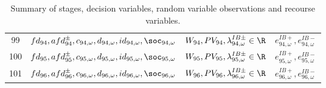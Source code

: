 \begin{table}[H]
\begin{tabular}{c c c c}
	99& $fd_{94}, afd^{\pm}_{94}, c_{94, \omega}, d_{94, \omega}, id_{94, \omega}, \soc_{94, \omega}$ & $W_{94}, PV_{94}, \lambda^{IB\pm}_{94, \omega} \in \R$ &  $e^{IB+}_{94, \omega}, e^{IB-}_{94, \omega}$\\
	100& $fd_{95}, afd^{\pm}_{95}, c_{95, \omega}, d_{95, \omega}, id_{95, \omega}, \soc_{95, \omega}$ & $W_{95}, PV_{95}, \lambda^{IB\pm}_{95, \omega} \in \R$ & $e^{IB+}_{95, \omega}, e^{IB-}_{95, \omega}$\\
	101& $fd_{96}, afd^{\pm}_{96}, c_{96, \omega}, d_{96, \omega}, id_{96, \omega}, \soc_{96, \omega}$  & $W_{96}, PV_{96}, \lambda^{IB\pm}_{96, \omega} \in \R$ & $e^{IB+}_{96, \omega}, e^{IB-}_{96, \omega}$\\
	
		
	
\end{tabular}
\caption{Summary of stages, decision variables, random variable observations and recourse variables.}
\label{TABLE:stages-rv-dv-96}
\end{table}